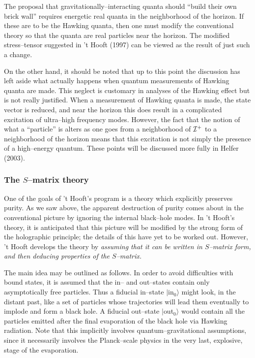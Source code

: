 The proposal  that gravitationally--interacting
quanta should ``build their own brick wall'' requires energetic 
real quanta in
the neighborhood of the horizon.  If these are to be the Hawking
quanta, then one must modify the
conventional theory so that the quanta are real particles near the
horizon.  The modified stress--tensor suggested in 't Hooft (1997) can
be viewed as the result of just such a change.

On the other hand, it should be noted that up to this point the
discussion has left aside what actually happens when quantum
measurements of Hawking quanta are made.  This neglect is customary in
analyses of the Hawking effect but is not really justified.  When a
measurement of Hawking quanta is made, the state vector is reduced,
and near the horizon this does result in a complicated excitation of
ultra--high frequency modes.  However, the fact that the notion of
what a ``particle'' is alters as one goes from a neighborhood of
${\cal I} ^+$ to a neighborhood of the horizon means that this excitation
is not simply the presence of a high--energy quantum.  These points
will be discussed more fully in Helfer (2003).

\subsubsection{The $S$--matrix theory}

One of the goals of 't Hooft's program is a theory which explicitly
preserves purity.  As we saw above, the apparent destruction of purity
comes about in the conventional picture by ignoring the internal
black--hole modes.  In 't Hooft's theory, it is anticipated that this
picture will be modified by the strong form of the holographic
principle; the details of this have yet to be worked out.
However, 't Hooft develops the
theory by \it assuming \rm that it can be written in $S$--matrix form,
and then deducing properties of the $S$--matrix.

The main idea may be outlined as follows.  In order to avoid
difficulties with bound states, it is assumed that the in-- and
out--states contain only asymptotically free particles.  Thus a
fiducial in--state $|$in${}_0 \rangle$ might look, in the distant
past, like a set of particles whose trajectories will lead them
eventually to implode and form a black hole.  A fiducial out--state
$|$out${}_0 \rangle$ would contain all the particles emitted after the
final evaporation of the black hole via Hawking radiation.  Note that
this implicitly involves quantum--gravitational assumptions, since it
necessarily involves the Planck--scale physics in the very last,
explosive, stage of the evaporation.

